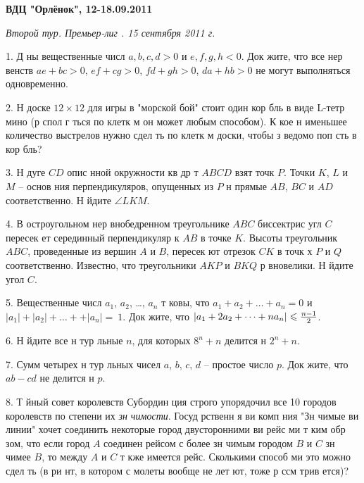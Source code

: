 \centerline{\bf ВДЦ "Орлёнок", 12-18.09.2011}

\smallskip

\centerline{\it Второй тур. Премьер-лиг . 15 сентября 2011 г.}

\medskip

1. Д ны вещественные числ  $a, b, c, d>0$ и $e, f, g, h<0$. Док жите, что все 
нер венств  $ae+bc>0$, $ef+cg>0$, $fd+gh>0$, $da+hb>0$ не могут выполняться 
одновременно. 

2. Н  доске $12\times 12$ для игры в "морской бой" стоит один кор бль 
в виде L-тетр мино (р спол г ться по клетк м он может любым способом). 
К кое н именьшее количество выстрелов нужно сдел ть по клетк м доски, 
чтобы з ведомо поп сть в кор бль? 

3. Н  дуге $CD$ опис нной окружности кв др т  $ABCD$ взят  точк  $P$. 
Точки $K$, $L$ и $M$ -- основ ния перпендикуляров, опущенных из $P$ н  прямые 
$AB$, $BC$ и $AD$ соответственно. Н йдите $\angle LKM$. 

4. В остроугольном нер внобедренном треугольнике $ABC$ биссектрис  угл  $C$ 
пересек ет серединный перпендикуляр к $AB$ в точке $K$. Высоты треугольник  
$ABC$, проведенные из вершин $A$ и $B$, пересек ют отрезок $CK$ в точк х 
$P$ и $Q$ соответственно. Известно, что треугольники $AKP$ и $BKQ$ р вновелики. 
Н йдите угол $C$. 

5. Вещественные числ  $a_1$, $a_2$, \dots, $a_n$ т ковы, что 
$a_1+a_2+\dots+a_n=0$ и $|a_1|+|a_2|+\dots++|a_n|=~1$. Док жите, что 
$|a_1+2a_2+\dots+na_n|\leq {n-1\over 2}$.

6. Н йдите все н тур льные $n$, для которых $8^n+n$ делится н  $2^n+n$. 

7. Сумм  четырех н тур льных чисел $a$, $b$, $c$, $d$ -- простое число $p$. 
Док жите, что $ab-cd$ не делится н  $p$. 

8. Т йный совет королевств  Субордин ция строго упорядочил все 10 городов королевств  
по степени их {\it зн чимости}. Госуд рственн я  ви комп ния "Зн чимые  ви линии" 
хочет соединить некоторые город  двусторонними  ви рейс ми т ким обр зом, что если город 
$A$ соединен рейсом с более зн чимым городом $B$ и $C$ зн чимее $B$, то 
между $A$ и $C$ т кже имеется рейс. Сколькими способ ми это можно сдел ть 
(в ри нт, в котором с молеты вообще не лет ют, тоже р ссм трив ется)?

